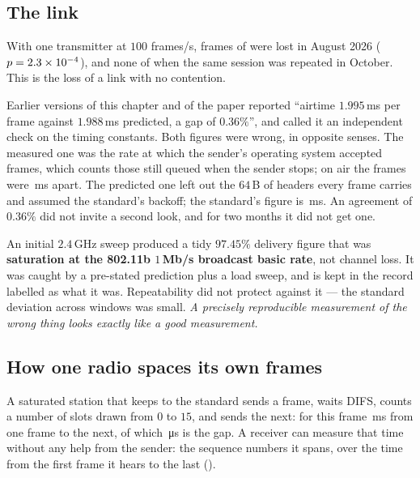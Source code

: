 \subsection{The link}

With one transmitter at $100$ frames/s, \hwLossFrames{} frames of \hwSentFrames{} were lost in
August 2026 ($p = 2.3\times10^{-4}$), and none of \hwSentFrames{} when the same session was repeated in
October. This is the loss of a link with no contention.

\begin{remark}
Earlier versions of this chapter and of the paper reported ``airtime $1.995$\,ms per frame
against $1.988$\,ms predicted, a gap of $0.36\%$'', and called it an independent check on the
timing constants. Both figures were wrong, in opposite senses. The measured one was the rate at
which the sender's operating system accepted frames, which counts those still queued when the
sender stops; on air the frames were \hwCycleOn\,ms apart. The predicted one left out the
$64$\,B of headers every frame carries and assumed the standard's backoff; the standard's
figure is \hwCycleStd\,ms. An agreement of $0.36\%$ did not invite a second look, and for two
months it did not get one.
\end{remark}

\begin{remark}
An initial $2.4$\,GHz sweep produced a tidy $97.45\%$ delivery figure that was \textbf{saturation
at the 802.11b $1$\,Mb/s broadcast basic rate}, not channel loss. It was caught by a pre-stated
prediction plus a load sweep, and is kept in the record labelled as what it was. Repeatability did
not protect against it --- the standard deviation across windows was small. \emph{A precisely
reproducible measurement of the wrong thing looks exactly like a good measurement.}
\end{remark}

\subsection{How one radio spaces its own frames}\label{sec:spacing}

A saturated station that keeps to the standard sends a frame, waits DIFS, counts a number of
slots drawn from $0$ to $15$, and sends the next: for this frame \hwCycleStd\,ms from one frame
to the next, of which \hwGapStd\,\si{\micro\second} is the gap. A receiver can measure that time
without any help from the sender: the sequence numbers it spans, over the time from the first
frame it hears to the last ().

